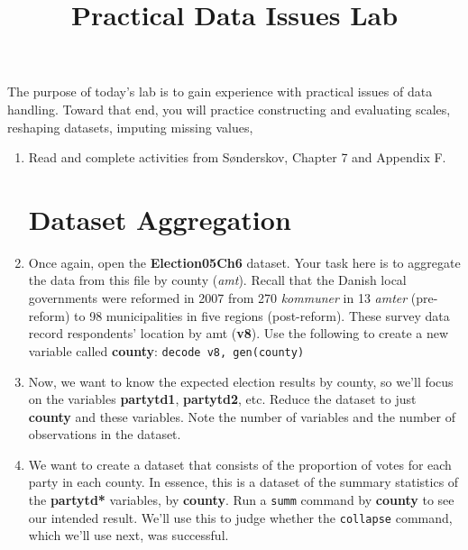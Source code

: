 \documentclass[a4paper,12pt]{article}
\title{Practical Data Issues Lab}
\author{}
\date{}
\begin{document}
	
\maketitle

\vspace{-2em}
	
\noindent The purpose of today's lab is to gain experience with practical issues of data handling. Toward that end, you will practice constructing and evaluating scales, reshaping datasets, imputing missing values, 

\begin{enumerate}\itemsep1em

\section*{Scale Construction}

\item Read and complete activities from S{\o}nderskov, Chapter 7 and Appendix F.

\section*{Dataset Aggregation}

\item Once again, open the \textbf{Election05Ch6} dataset. Your task here is to aggregate the data from this file by county (\textit{amt}). Recall that the Danish local governments were reformed in 2007 from 270 \textit{kommuner} in 13 \textit{amter} (pre-reform) to 98 municipalities in five regions (post-reform). These survey data record respondents' location by amt (\textbf{v8}). Use the following to create a new variable called \textbf{county}: \texttt{decode v8, gen(county)}

\item Now, we want to know the expected election results by county, so we'll focus on the variables \textbf{partytd1}, \textbf{partytd2}, etc. Reduce the dataset to just \textbf{county} and these variables. Note the number of variables and the number of observations in the dataset.

\item We want to create a dataset that consists of the proportion of votes for each party in each county. In essence, this is a dataset of the summary statistics of the \textbf{partytd*} variables, by \textbf{county}. Run a \texttt{summ} command by \textbf{county} to see our intended result. We'll use this to judge whether the \texttt{collapse} command, which we'll use next, was successful.


\end{enumerate}
\end{document}
